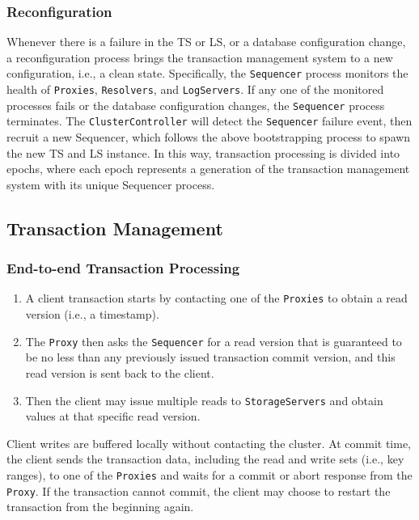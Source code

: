 \documentclass[11pt]{article}
\begin{document}
\subsubsection{Reconfiguration}
\label{sec:org70a421b}
Whenever there is a failure in the TS or LS, or a database configuration change, a reconfiguration
process brings the transaction management system to a new configuration, i.e., a clean state.
Specifically, the \texttt{Sequencer} process monitors the health of \texttt{Proxies}, \texttt{Resolvers}, and \texttt{LogServers}. If any
one of the monitored processes fails or the database configuration changes, the \texttt{Sequencer} process
terminates. The \texttt{ClusterController} will detect the \texttt{Sequencer} failure event, then recruit a new
Sequencer, which follows the above bootstrapping process to spawn the new TS and LS instance. In this
way, transaction processing is divided into epochs, where each epoch represents a generation of the
transaction management system with its unique Sequencer process.
\subsection{Transaction Management}
\label{sec:org36082c0}
\subsubsection{End-to-end Transaction Processing}
\label{sec:org836a7eb}
\begin{enumerate}
\item A client transaction starts by contacting one of the \texttt{Proxies} to obtain a read version (i.e., a
timestamp).
\item The \texttt{Proxy} then asks the \texttt{Sequencer} for a read version that is guaranteed to be no less than any
previously issued transaction commit version, and this read version is sent back to the client.
\item Then the client may issue multiple reads to \texttt{StorageServers} and obtain values at that specific read
version.
\end{enumerate}

Client writes are buffered locally without contacting the cluster. At commit time, the client sends
the transaction data, including the read and write sets (i.e., key ranges), to one of the \texttt{Proxies} and
waits for a commit or abort response from the \texttt{Proxy}. If the transaction cannot commit, the client may
choose to restart the transaction from the beginning again.
\end{document}
